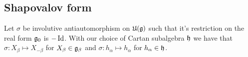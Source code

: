 %
%
%
%

\subsection{Shapovalov form}

Let $\sigma$ be involutive antiautomorphism on $\mathfrak{U(g)}$ such that it's restriction on the real form $\mathfrak{g}_0$ is $-\operatorname{\mathrm{Id}}$. With our choice of Cartan subalgebra $\mathfrak{h}$ we have that $\sigma: X_\beta \mapsto X_{-\beta}$ for $X_\beta \in \mathfrak{g}_\beta$ and $\sigma: h_\alpha \mapsto h_\alpha$ for $h_\alpha \in \mathfrak{h}$.

